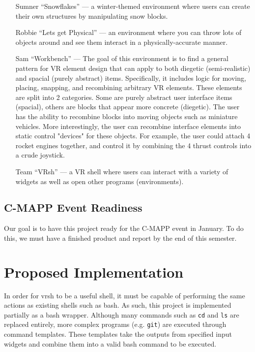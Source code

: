 \documentclass[titlepage,12pt]{article}
\begin{document}
\begin{enumerate}[leftmargin=*]
    \item [Sumner] ``Snowflakes'' --- a winter-themed environment where users
        can create their own structures by manipulating snow blocks.
    \item [Robbie] ``Lets get Physical'' --- an environment where you can throw
        lots of objects around and see them interact in a physically-accurate
        manner.
    \item [Sam] ``Workbench'' --- The goal of this environment is to find a general 
    pattern for VR element design that can apply to both diegetic (semi-realistic) 
    and spacial (purely abstract) items. Specifically, it includes logic for moving,
    placing, snapping, and recombining arbitrary VR elements. These elements are split
    into 2 categories. Some are purely abstract user interface items (spacial), others
    are blocks that appear more concrete (diegetic). The user has the ability to recombine 
    blocks into moving objects such as miniature vehicles. More interestingly, the user can
    recombine interface elements into static control "devices" for these objects. For
    example, the user could attach 4 rocket engines together, and control it by combining
    the 4 thrust controls into a crude joystick.
    \item [Team] ``VRsh'' --- a VR shell where users can interact with a variety
        of widgets as well as open other programs (environments).
\end{enumerate}

\subsection{C-MAPP Event Readiness}
Our goal is to have this project ready for the C-MAPP event in January. To do
this, we must have a finished product and report by the end of this semester.

\section{Proposed Implementation}

In order for vrsh to be a useful shell, it must be capable of performing the same 
actions as existing shells such as bash. As such, this project is implemented 
partially as a bash wrapper. Although many commands such as \texttt{cd} and
\texttt{ls} are replaced entirely, more complex programs (e.g. \texttt{git}) 
are executed through command templates. These templates take the outputs from specified 
input widgets and combine them into a valid bash command to be executed. 
\end{document}
